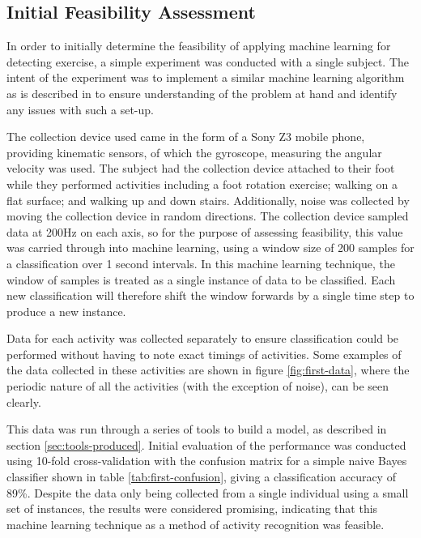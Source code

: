 
\subsection{Initial Feasibility Assessment}
In order to initially determine the feasibility of applying machine learning for detecting exercise, a simple experiment was conducted with a single subject. The intent of the experiment was to implement a similar machine learning algorithm as is described in \cite{kwapisz2011activity} to ensure understanding of the problem at hand and identify any issues with such a set-up.

The collection device used came in the form of a Sony Z3 mobile phone, providing kinematic sensors, of which the gyroscope, measuring the angular velocity was used. The subject had the collection device attached to their foot while they performed activities including a foot rotation exercise; walking on a flat surface; and walking up and down stairs. Additionally, noise was collected by moving the collection device in random directions. The collection device sampled data at 200Hz on each axis, so for the purpose of assessing feasibility, this value was carried through into machine learning, using a window size of 200 samples for a classification over 1 second intervals. In this machine learning technique, the window of samples is treated as a single instance of data to be classified. Each new classification will therefore shift the window forwards by a single time step to produce a new instance.

Data for each activity was collected separately to ensure classification could be performed without having to note exact timings of activities. Some examples of the data collected in these activities are shown in figure \ref{fig:first-data}, where the periodic nature of all the activities (with the exception of noise), can be seen clearly.

This data was run through a series of tools to build a model, as described in section \ref{sec:tools-produced}. Initial evaluation of the performance was conducted using 10-fold cross-validation with the confusion matrix for a simple naive Bayes classifier shown in table \ref{tab:first-confusion}, giving a classification accuracy of 89\%. Despite the data only being collected from a single individual using a small set of instances, the results were considered promising, indicating that this machine learning technique as a method of activity recognition was feasible.

